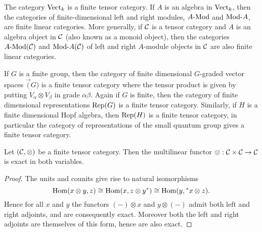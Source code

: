 \documentclass{amsart}
\begin{document}
\begin{example}
	The category $\mathrm{Vect}_k$ is a finite tensor category. If $A$ is an algebra in $\mathrm{Vect}_k$, then the categories of finite-dimensional left and right modules, $\Mod{A}{}$ and $\Mod{}{A}$, are finite linear categories. More generally, if $\mathcal C$ is a tensor category and $A$ is an algebra object in $\mathcal C$ (also known as a monoid object), then the categories $\Mod{A}{}(\cC)$ and $\Mod{}{A}(\cC)$ of left and right $A$-module objects in $\mathcal C$ are also finite linear categories.
\end{example}

\begin{example}
If $G$ is a finite group, then the category of finite dimensional $G$-graded vector spaces $\Vec(G)$ is a finite tensor category where the tensor product is given by putting $V_\alpha \otimes V_\beta$ in grade $\alpha \beta$.  Again if $G$ is finite, then the category of finite dimensional representations $\mathrm{Rep}(G)$ is a finite tensor category.  Similarly, if $H$ is a finite dimensional Hopf algebra, then $\mathrm{Rep}(H)$ is a finite tensor category, in particular the category of representations of the small quantum group gives a finite tensor category.
\end{example}


\begin{lemma} \cite[2.1.8]{MR1797619} \cite[Prop. 1.13.1]{EGNO}  \label{lma:RigidIsExact}
	Let $(\mathcal C, \otimes)$ be a finite tensor category. Then the multilinear functor $\otimes: \mathcal C \times \mathcal C \to \mathcal C$ is exact in both variables. 
\end{lemma}

\begin{proof}
	The units and counits give rise to natural isomorphisms
 \begin{equation*} 
 	\operatorname{Hom}(x \otimes y, z) \cong \operatorname{Hom}( x, z \otimes y^*) \cong \operatorname{Hom}(y, {}^*x \otimes z).
 \end{equation*}
	Hence for all $x$ and $y$ the functors $(-)\otimes x$ and $y \otimes (-)$ admit both left and right adjoints, and are consequently exact. Moreover both the left and right adjoints are themselves of this form, hence are also  exact. 
\end{proof}
\end{document}
